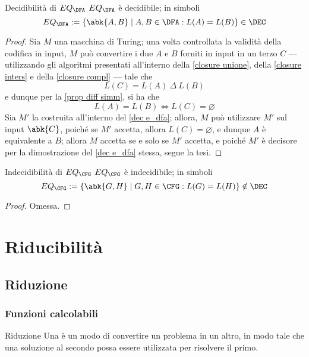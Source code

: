 \documentclass[a4paper, 12pt]{report}
\begin{document}
    \begin{framedthm}{Decidibilità di $EQ_\DFA$}
        $EQ_\DFA$ è decidibile; in simboli $$EQ_\DFA := \{\abk{A, B} \mid A, B \in \DFA : L(A) = L(B) \} \in \DEC$$
    \end{framedthm}

    \begin{proof}
        Sia $M$ una macchina di Turing; una volta controllata la validità della codifica in input, $M$ può convertire i due \DFA $A$ e $B$ forniti in input in un terzo \DFA $C$ --- utilizzando gli algoritmi presentati all'interno della \cref{closure unione}, della \cref{closure inters} e della \cref{closure compl} --- tale che $$L(C) = L(A) \ \Delta \ L(B)$$ e dunque per la \cref{prop diff simm}, si ha che $$L(A) = L(B) \iff L(C) = \varnothing$$ Sia $M'$ la \TM costruita all'interno del \cref{dec e_dfa}; allora, $M$ può utilizzare $M'$ sul  input $\abk{C}$, poiché se $M'$ accetta, allora $L(C) = \varnothing$, e dunque $A$ è equivalente a $B$; allora $M$ accetta se e solo se $M'$ accetta, e poiché $M'$ è decisore per la dimostrazione del \cref{dec e_dfa} stessa, segue la tesi.
    \end{proof}

    \begin{framedthm}{Indecidibilità di $EQ_\CFG$}
        $EQ_\CFG$ è indecidibile; in simboli $$EQ_\CFG := \{\abk{G,H} \mid G,H \in \CFG : L(G) = L(H)\} \notin \DEC$$
    \end{framedthm}

    \begin{proof}
        Omessa.
    \end{proof}

    \chapter{Riducibilità}

    \section{Riduzione}

    \subsection{Funzioni calcolabili}

    \begin{frameddefn}{Riduzione}
        Una  è un modo di convertire un problema in un altro, in modo tale che una soluzione al secondo possa essere utilizzata per risolvere il primo.
    \end{frameddefn}
\end{document}
